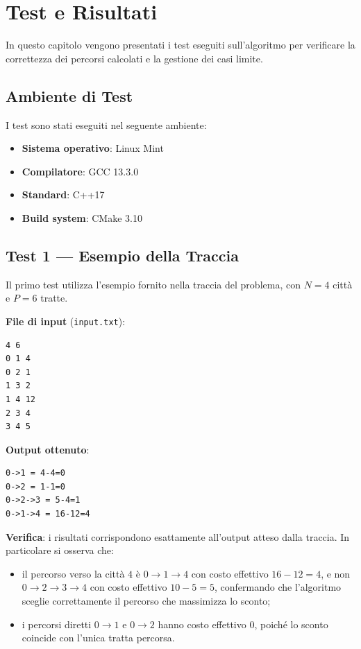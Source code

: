 \chapter{Test e Risultati}

In questo capitolo vengono presentati i test eseguiti sull'algoritmo 
per verificare la correttezza dei percorsi calcolati e la gestione 
dei casi limite.

\section{Ambiente di Test}

I test sono stati eseguiti nel seguente ambiente:

\begin{itemize}
    \item \textbf{Sistema operativo}: Linux Mint
    \item \textbf{Compilatore}: GCC 13.3.0
    \item \textbf{Standard}: C++17
    \item \textbf{Build system}: CMake 3.10
\end{itemize}

\section{Test 1 --- Esempio della Traccia}

Il primo test utilizza l'esempio fornito nella traccia del problema,
con $N = 4$ città e $P = 6$ tratte.

\textbf{File di input} (\texttt{input.txt}):

\begin{lstlisting}
4 6
0 1 4
0 2 1
1 3 2
1 4 12
2 3 4
3 4 5
\end{lstlisting}

\textbf{Output ottenuto}:

\begin{lstlisting}
0->1 = 4-4=0
0->2 = 1-1=0
0->2->3 = 5-4=1
0->1->4 = 16-12=4
\end{lstlisting}

\textbf{Verifica}: i risultati corrispondono esattamente all'output 
atteso dalla traccia. In particolare si osserva che:

\begin{itemize}
    \item il percorso verso la città $4$ è $0 \to 1 \to 4$ con costo 
    effettivo $16 - 12 = 4$, e non $0 \to 2 \to 3 \to 4$ con costo 
    effettivo $10 - 5 = 5$, confermando che l'algoritmo sceglie 
    correttamente il percorso che massimizza lo sconto;
    \item i percorsi diretti $0 \to 1$ e $0 \to 2$ hanno costo 
    effettivo $0$, poiché lo sconto coincide con l'unica tratta 
    percorsa.
\end{itemize}

